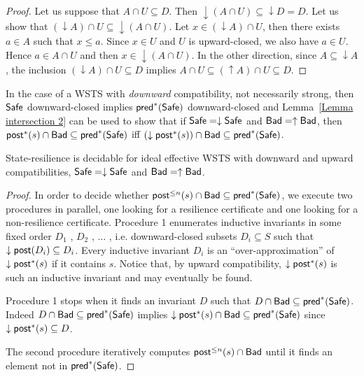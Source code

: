 \begin{proof}
Let us suppose that $A \cap U \subseteq D$. Then ${\downarrow (A \cap U)} \subseteq {\downarrow D} = D$. Let us show that $({\downarrow A}) \cap U \subseteq {\downarrow (A \cap U)}$. Let $x \in ({\downarrow A}) \cap U$, then there exists $a \in A$ such that $x \leq a$. Since $x \in U$ and $U$ is upward-closed, we also have $a \in U$. Hence $a \in A \cap U$ and then $x \in { \downarrow (A \cap U)}$. In the other direction, since $A \subseteq {\downarrow A}$, the inclusion $({\downarrow  A}) \cap U \subseteq D$ implies $A \cap U \subseteq ({\uparrow  A}) \cap U \subseteq D$.
\end{proof}


In the case of a WSTS with \emph{downward} compatibility, not necessarily strong,
then $\textsf{Safe}$ downward-closed implies $\textsf{pred}^*(\textsf{Safe})$ downward-closed and
Lemma~\ref{Lemma intersection 2} can be used to show that
if $\textsf{Safe} = \downarrow \textsf{Safe}$ and $\textsf{Bad} = \uparrow \textsf{Bad}$,
then
$\textsf{post}^*(s) \cap \textsf{Bad} \subseteq \textsf{pred}^*(\textsf{Safe})$  iff $ (\downarrow  \textsf{post}^*(s)) \cap \textsf{Bad} \subseteq \textsf{pred}^*(\textsf{Safe})$.


\begin{theorem}\label{downward srp}
{\sc State-resilience} is decidable for ideal effective WSTS with downward and upward compatibilities,
$\textsf{Safe} = \downarrow \textsf{Safe}$ and $\textsf{Bad} = \uparrow \textsf{Bad}$.
\end{theorem}

\begin{proof}
In order to decide whether $\textsf{post}^{\leq n}(s) \cap \textsf{Bad} \subseteq \textsf{pred}^*(\textsf{Safe})$, we execute two procedures in parallel,
one looking for a resilience certificate and one looking for a non-resilience certificate.
Procedure 1 enumerates inductive invariants in some fixed order $D_1$ , $D_2$ , $\ldots$ , i.e. downward-closed subsets $D_i \subseteq S$ such that $\downarrow \textsf{post}(D_i ) \subseteq D_i$. 
Every inductive invariant $D_i$ is an “over-approximation” of $\downarrow \textsf{post}^*(s)$ if it contains $s$.
Notice that, by 
upward compatibility, $\downarrow \textsf{post}^*(s)$ is such an inductive invariant and may eventually be found.

Procedure 1 stops when it finds an invariant $D$ such that
$D  \cap \textsf{Bad} \subseteq \textsf{pred}^*(\textsf{Safe})$. 
Indeed
$D  \cap \textsf{Bad} \subseteq  \textsf{pred}^*(\textsf{Safe})$ implies
$\downarrow \textsf{post}^*(s) \cap \textsf{Bad} \subseteq  \textsf{pred}^*(\textsf{Safe})$
since $ \downarrow \textsf{post}^*(s)  \subseteq D$.

The second procedure iteratively computes
$\textsf{post}^{\leq n}(s) \cap \textsf{Bad}$
until it finds an element
not in $\textsf{pred}^*(\textsf{Safe})$.
\end{proof}

